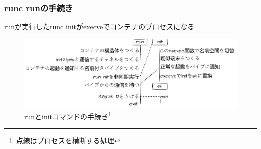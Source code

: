 \documentclass[unicode, 14pt, aspectratio=169]{beamer}
\begin{document}
\begin{frame}
  \frametitle{runc runの手続き}
  runが実行したrunc initが\href{https://man7.org/linux/man-pages/man2/execve.2.html}{execve}でコンテナのプロセスになる
  \begin{figure}
    \centering
    \includegraphics[width=13cm]{images/overview.drawio.pdf}
    \caption{runとinitコマンドの手続き\footnote{点線はプロセスを横断する処理}}
  \end{figure}
\end{frame}
\end{document}
